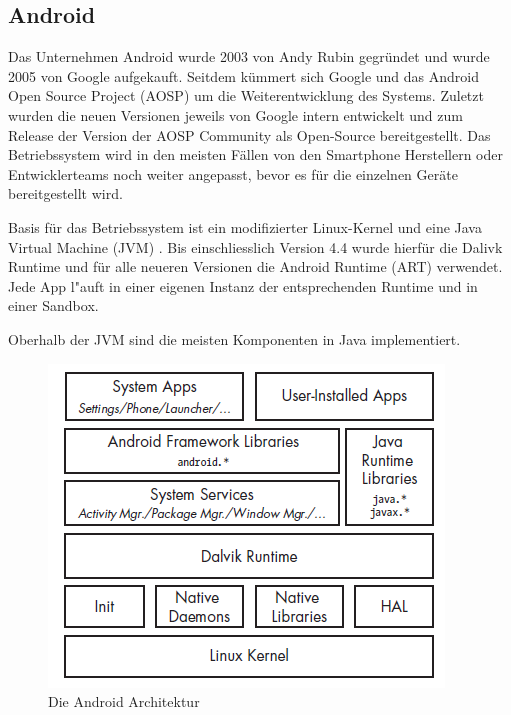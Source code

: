 \subsection{Android}
	Das Unternehmen Android wurde 2003 von Andy Rubin gegründet und wurde 2005 von Google aufgekauft. Seitdem kümmert sich Google und das Android Open Source Project (AOSP) um die Weiterentwicklung des Systems. Zuletzt wurden die neuen Versionen jeweils von Google intern entwickelt und zum Release der Version der AOSP Community als Open-Source bereitgestellt. Das Betriebssystem wird in den meisten Fällen von den Smartphone Herstellern oder Entwicklerteams noch weiter angepasst, bevor es für die einzelnen Geräte bereitgestellt wird.\\
	
	\begin{flushleft}
		Basis für das Betriebssystem ist ein modifizierter Linux-Kernel und eine Java Virtual Machine (JVM) \cite{ArtDalvik}. Bis einschliesslich Version 4.4 wurde hierfür die Dalivk Runtime und für alle neueren Versionen die Android Runtime (ART) verwendet. Jede App l"auft in einer eigenen Instanz der entsprechenden Runtime und in einer Sandbox.\newline

	Oberhalb der JVM sind die meisten Komponenten in Java implementiert.\\
	\end{flushleft}	
	\begin{figure}[h]
		\centering
		\includegraphics[width=0.7\linewidth]{android_pages/graphics/architektur_android_.png}
		\caption{Die Android Architektur \protect\cite[S. 2]{Elenkov2014} }
		\label{fig:architektur_android}
	\end{figure}
	
